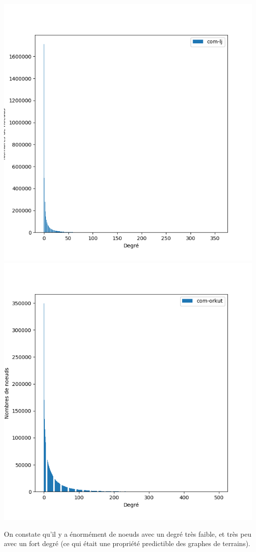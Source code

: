 \documentclass{report}
\begin{document}
\begin{center}
  \includegraphics[height=.3\paperwidth]{assets/com-lj-dist.png}
  \includegraphics[height=.3\paperwidth]{assets/com-orkut-dist.png}\\
\end{center}
On constate qu'il y a énormément de noeuds avec un degré très faible, et très peu avec un fort degré (ce qui était une propriété predictible des graphes de terrains).
\end{document}
